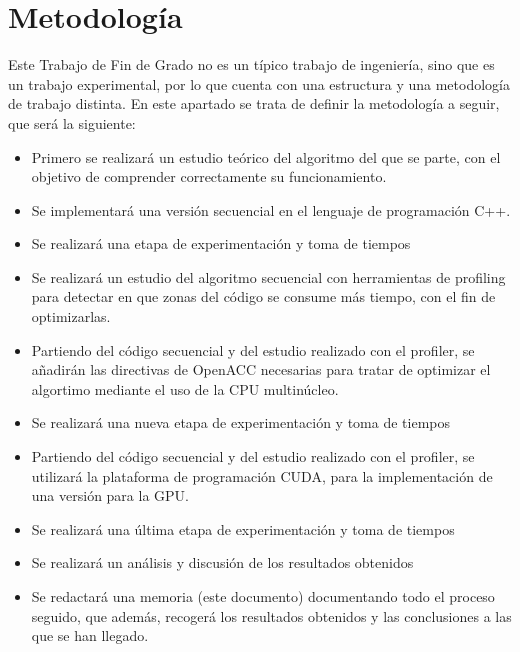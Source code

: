 \chapter{Metodología}

Este Trabajo de Fin de Grado no es un típico trabajo de ingeniería, sino que es un trabajo experimental, por lo que cuenta con una estructura y una metodología de trabajo distinta. En este apartado se trata de definir la metodología a seguir, que será la siguiente: \\

\begin{itemize}
    \item Primero se realizará un estudio teórico del algoritmo del que se parte, con el objetivo de comprender correctamente su funcionamiento.
    \item Se implementará una versión secuencial en el lenguaje de programación C++.
    \item Se realizará una etapa de experimentación y toma de tiempos 
    \item Se realizará un estudio del algoritmo secuencial con herramientas de profiling para detectar en que zonas del código se consume más tiempo, con el fin de optimizarlas.
    \item Partiendo del código secuencial y del estudio realizado con el profiler, se añadirán las directivas de OpenACC necesarias para tratar de optimizar el algortimo mediante el uso de la CPU multinúcleo.
    \item Se realizará una nueva etapa de experimentación y toma de tiempos
    \item Partiendo del código secuencial y del estudio realizado con el profiler, se utilizará la plataforma de programación CUDA, para la implementación de una versión para la GPU.
    \item Se realizará una última etapa de experimentación y toma de tiempos 
    \item Se realizará un análisis y discusión de los resultados obtenidos
    \item Se redactará una memoria (este documento) documentando todo el proceso seguido, que además, recogerá los resultados obtenidos y las conclusiones a las que se han llegado.
\end{itemize}
 
